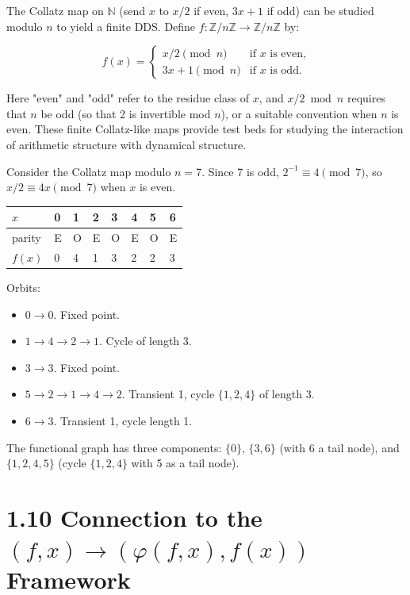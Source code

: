 The Collatz map on $\mathbb{N}$ (send $x$ to $x/2$ if even, $3x+1$ if odd) can be studied modulo $n$ to yield a finite DDS. Define $f: \mathbb{Z}/n\mathbb{Z} \to \mathbb{Z}/n\mathbb{Z}$ by:

\[
f(x) = \begin{cases} x/2 \pmod{n} & \text{if } x \text{ is even,} \\ 3x + 1 \pmod{n} & \text{if } x \text{ is odd.} \end{cases}
\]

Here "even" and "odd" refer to the residue class of $x$, and $x/2 \bmod n$ requires that $n$ be odd (so that 2 is invertible mod $n$), or a suitable convention when $n$ is even. These finite Collatz-like maps provide test beds for studying the interaction of arithmetic structure with dynamical structure.

\begin{example}
Consider the Collatz map modulo $n = 7$. Since 7 is odd, $2^{-1} \equiv 4 \pmod{7}$, so $x/2 \equiv 4x \pmod{7}$ when $x$ is even.

\begin{tabular}{|l|l|l|l|l|l|l|l|}
\hline
$x$ & 0 & 1 & 2 & 3 & 4 & 5 & 6 \\
\hline
parity & E & O & E & O & E & O & E \\
$f(x)$ & 0 & 4 & 1 & 3 & 2 & 2 & 3 \\
\hline
\end{tabular}


Orbits:
\end{example}
\begin{itemize}
  \item $0 \to 0$. Fixed point.
  \item $1 \to 4 \to 2 \to 1$. Cycle of length 3.
  \item $3 \to 3$. Fixed point.
  \item $5 \to 2 \to 1 \to 4 \to 2$. Transient 1, cycle $\{ 1, 2, 4\} $ of length 3.
  \item $6 \to 3$. Transient 1, cycle length 1.
\end{itemize}

The functional graph has three components: $\{ 0\} $, $\{ 3, 6\} $ (with 6 a tail node), and $\{ 1, 2, 4, 5\} $ (cycle $\{ 1,2,4\} $ with 5 as a tail node).

\section{1.10 Connection to the $(f, x) \to (\varphi(f,x), f(x))$ Framework}

